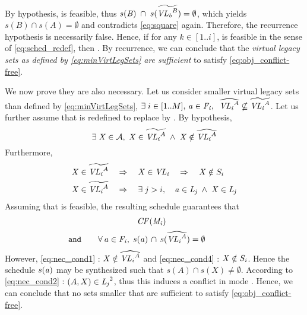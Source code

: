 By hypothesis,  is feasible, thus $s(\mathit{B}) \; \cap \; s(\widetilde{\mathit{VL_{b}}^{B}}) = \emptyset$, which yields $s(B) \cap s(A) = \emptyset$ and contradicts \eqref{eq:square} again.
Therefore, the recurrence hypothesis is necessarily false.
Hence, if for any $k \in [1 .. i]$,  is feasible in the sense of \eqref{eq:sched_redef}, then .
By recurrence, we can conclude that the \emph{virtual legacy sets as defined by \eqref{eq:minVirtLegSets} are sufficient} to satisfy \eqref{eq:obj_conflict-free}.

We now prove they are also necessary.
Let us consider smaller virtual legacy sets than defined by \eqref{eq:minVirtLegSets}, \ie $\exists \; i \in [1..M],\, \mathit{a_{}} \in \mathit{F_{i}}, \;\;\widehat{\mathit{VL_{i}}^{A}} \nsubseteq \widetilde{\mathit{VL_{i}}^{A}}$. Let us further assume that \sched{} is redefined to replace \minvirtlegApp{}{} by \minminvirtlegApp{}{}. By hypothesis,
\begin{equation}
\label{eq:nec_cond1}
\exists \; \mathit{X} \in \mathcal{A}, \; \mathit{X} \in \widetilde{\mathit{VL_{i}}^{A}}\; \wedge \; {\mathit{X} \notin \widehat{\mathit{VL_{i}}^{A}}}
\end{equation}
Furthermore,
\begin{align}
\label{eq:nec_cond4}
\appX \in \minvirtlegApp{i}{A}
	&\quad \Rightarrow \quad
	\appX \in \virtlegApp{i} \quad \Rightarrow \quad {\appX \notin S_{i}}\\
\label{eq:nec_cond2}
\appX \in \minvirtlegApp{i}{A}
	&\quad \Rightarrow \quad
	\exists \; j>i, \quad {\app \in \legApp{j}} \; \wedge \; \appX \in \legApp{j}
\end{align}
Assuming that \sched{\modei} is feasible, the resulting schedule guarantees that
\begin{equation}
\label{eq:nec_cond5}
\begin{tabular}{l@{\quad\quad}cp{30pt}}
	&
	\cf{\modei}
	&\\[5pt]
\texttt{and}
	&
	$\forall \, \app \in \freeApp{i},\; s(\app) \, \cap \, s(\minminvirtlegApp{i}{A}) = \emptyset$
	&
\end{tabular}
\end{equation}
However, \eqref{eq:nec_cond1} : $\mathit{X} \notin \widehat{\mathit{VL_{i}}^{A}}$ and \eqref{eq:nec_cond4} : $\mathit{X} \notin S_{i}$. Hence the schedule $s(\mathit{a_{}})$ may be synthesized such that $s(A) \cap s(X) \not= \emptyset$. According to \eqref{eq:nec_cond2} : $(A,X) \in \mathit{L_{j}}^2$, thus this induces a conflict in mode \modej.
Hence, we can conclude that no sets \minminvirtlegApp{}{} smaller that \minvirtlegApp{}{} are sufficient to satisfy \eqref{eq:obj_conflict-free}.

